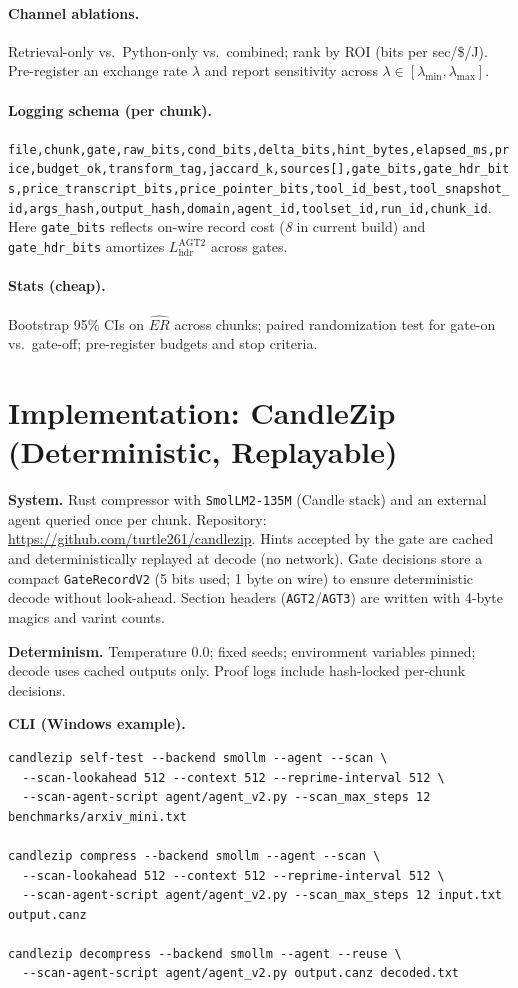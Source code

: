 \documentclass[12pt,a4paper]{article}
\begin{document}
\paragraph{Channel ablations.}
Retrieval-only vs.\ Python-only vs.\ combined; rank by ROI (bits per sec/\$/J). Pre-register an exchange rate $\lambda$ and report sensitivity across $\lambda\in[\lambda_{\min},\lambda_{\max}]$.

\paragraph{Logging schema (per chunk).}
\texttt{file,chunk,gate,raw\_bits,cond\_bits,delta\_bits,hint\_bytes,elapsed\_ms,price,budget\_ok,transform\_tag,jaccard\_k,sources[],gate\_bits,gate\_hdr\_bits,price\_transcript\_bits,price\_pointer\_bits,tool\_id\_best,tool\_snapshot\_id,args\_hash,output\_hash,domain,agent\_id,toolset\_id,run\_id,chunk\_id}.\\
Here \texttt{gate\_bits} reflects on-wire record cost (\emph{8} in current build) and \texttt{gate\_hdr\_bits} amortizes $L_{\mathrm{hdr}}^{\mathrm{AGT2}}$ across gates.

\paragraph{Stats (cheap).}
Bootstrap 95\% CIs on $\widehat{ER}$ across chunks; paired randomization test for gate-on vs.\ gate-off; pre-register budgets and stop criteria.

\section{Implementation: CandleZip (Deterministic, Replayable)}
\label{sec:impl}
\textbf{System.} Rust compressor with \texttt{SmolLM2-135M} (Candle stack) and an external agent queried once per chunk. Repository: \url{https://github.com/turtle261/candlezip}. Hints accepted by the gate are cached and deterministically replayed at decode (no network). Gate decisions store a compact \texttt{GateRecordV2} (5 bits used; 1 byte on wire) to ensure deterministic decode without look-ahead. Section headers (\texttt{AGT2}/\texttt{AGT3}) are written with 4-byte magics and varint counts.

\textbf{Determinism.} Temperature $0.0$; fixed seeds; environment variables pinned; decode uses cached outputs only. Proof logs include hash-locked per-chunk decisions.

\textbf{CLI (Windows example).}
\begin{verbatim}
candlezip self-test --backend smollm --agent --scan \
  --scan-lookahead 512 --context 512 --reprime-interval 512 \
  --scan-agent-script agent/agent_v2.py --scan_max_steps 12 benchmarks/arxiv_mini.txt

candlezip compress --backend smollm --agent --scan \
  --scan-lookahead 512 --context 512 --reprime-interval 512 \
  --scan-agent-script agent/agent_v2.py --scan_max_steps 12 input.txt output.canz

candlezip decompress --backend smollm --agent --reuse \
  --scan-agent-script agent/agent_v2.py output.canz decoded.txt
\end{verbatim}
\end{document}
